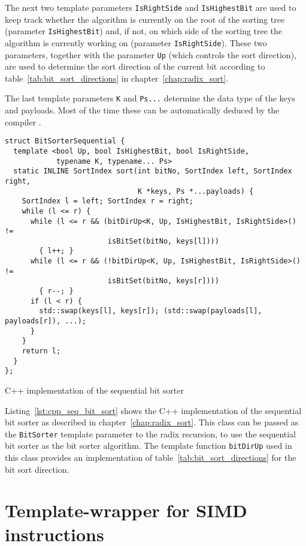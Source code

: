 \documentclass[12pt, a4paper, openright, twoside]{tiarbeit}
\begin{document}
The next two template parameters \texttt{IsRightSide} and \texttt{IsHighestBit}
are used to keep track whether the algorithm is currently on the root of the
sorting tree (parameter \texttt{IsHighestBit}) and, if not, on which side of the
sorting tree the algorithm is currently working on (parameter \texttt{IsRightSide}).
These two parameters, together with the parameter \texttt{Up}
(which controls the sort direction), are used to
determine the sort direction of the current bit according to
table~\ref{tab:bit_sort_directions} in chapter~\ref{chap:radix_sort}.

The last template parameters \texttt{K} and \texttt{Ps...}
determine the data type of the keys and payloads. Most of the time these
can be automatically deduced by the compiler \citep{cpp_templates}.

\begin{listing}[htb!]
  \begin{verbatim}
struct BitSorterSequential {
  template <bool Up, bool IsHighestBit, bool IsRightSide,
            typename K, typename... Ps>
  static INLINE SortIndex sort(int bitNo, SortIndex left, SortIndex right,
                               K *keys, Ps *...payloads) {
    SortIndex l = left; SortIndex r = right;
    while (l <= r) {
      while (l <= r && (bitDirUp<K, Up, IsHighestBit, IsRightSide>() !=
                        isBitSet(bitNo, keys[l])))
        { l++; }
      while (l <= r && (!bitDirUp<K, Up, IsHighestBit, IsRightSide>() !=
                        isBitSet(bitNo, keys[r])))
        { r--; }
      if (l < r) {
        std::swap(keys[l], keys[r]); (std::swap(payloads[l], payloads[r]), ...);
      }
    }
    return l;
  }
};
  \end{verbatim}
  \caption{C++ implementation of the sequential bit sorter}
  \label{lst:cpp_seq_bit_sort}
\end{listing}

Listing~\ref{lst:cpp_seq_bit_sort} shows the C++ implementation of the
sequential bit sorter as described in chapter~\ref{chap:radix_sort}.
This
class can be passed as the \texttt{BitSorter} template parameter to the
radix recursion, to use the sequential bit sorter as the bit sorter algorithm.
The template function \texttt{bitDirUp} used in this class provides an implementation
of table~\ref{tab:bit_sort_directions} for the bit sort direction.

\section{Template-wrapper for SIMD instructions}
\label{sec:template_wrapper}
\end{document}
